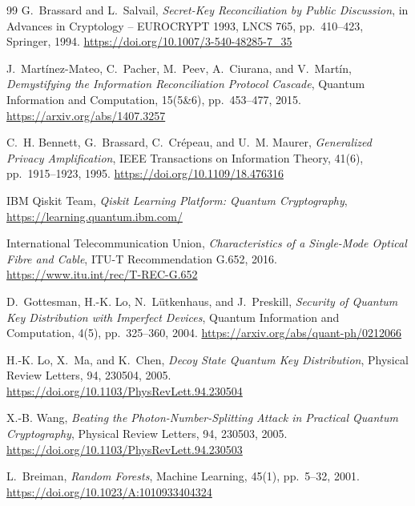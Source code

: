 \documentclass[12pt, a4paper]{article}
\begin{document}
\begin{thebibliography}{99}
    G.~Brassard and L.~Salvail,
    \textit{Secret-Key Reconciliation by Public Discussion},
    in Advances in Cryptology -- EUROCRYPT 1993, LNCS 765,
    pp.~410--423, Springer, 1994.
    \url{https://doi.org/10.1007/3-540-48285-7_35}

    J.~Mart\'{i}nez-Mateo, C.~Pacher, M.~Peev, A.~Ciurana, and
    V.~Mart\'{i}n,
    \textit{Demystifying the Information Reconciliation Protocol
    Cascade},
    Quantum Information and Computation, 15(5\&6), pp.~453--477, 2015.
    \url{https://arxiv.org/abs/1407.3257}

    C.~H. Bennett, G.~Brassard, C.~Cr\'{e}peau, and U.~M. Maurer,
    \textit{Generalized Privacy Amplification},
    IEEE Transactions on Information Theory, 41(6), pp.~1915--1923,
    1995.
    \url{https://doi.org/10.1109/18.476316}

  IBM Qiskit Team,
  \textit{Qiskit Learning Platform: Quantum Cryptography},
  \url{https://learning.quantum.ibm.com/}

    International Telecommunication Union,
    \textit{Characteristics of a Single-Mode Optical Fibre and Cable},
    ITU-T Recommendation G.652, 2016.
    \url{https://www.itu.int/rec/T-REC-G.652}

    D.~Gottesman, H.-K. Lo, N.~L\"utkenhaus, and J.~Preskill,
    \textit{Security of Quantum Key Distribution with Imperfect
    Devices},
    Quantum Information and Computation, 4(5), pp.~325--360, 2004.
    \url{https://arxiv.org/abs/quant-ph/0212066}

    H.-K. Lo, X.~Ma, and K.~Chen,
    \textit{Decoy State Quantum Key Distribution},
    Physical Review Letters, 94, 230504, 2005.
    \url{https://doi.org/10.1103/PhysRevLett.94.230504}

    X.-B. Wang,
    \textit{Beating the Photon-Number-Splitting Attack in Practical
    Quantum Cryptography},
    Physical Review Letters, 94, 230503, 2005.
    \url{https://doi.org/10.1103/PhysRevLett.94.230503}

    L.~Breiman,
    \textit{Random Forests},
    Machine Learning, 45(1), pp.~5--32, 2001.
    \url{https://doi.org/10.1023/A:1010933404324}


\end{thebibliography}
\end{document}

